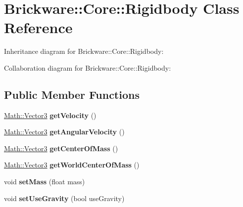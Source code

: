 \hypertarget{classBrickware_1_1Core_1_1Rigidbody}{}\section{Brickware\+:\+:Core\+:\+:Rigidbody Class Reference}
\label{classBrickware_1_1Core_1_1Rigidbody}


Inheritance diagram for Brickware\+:\+:Core\+:\+:Rigidbody\+:


Collaboration diagram for Brickware\+:\+:Core\+:\+:Rigidbody\+:
\subsection*{Public Member Functions}
\begin{DoxyCompactItemize}
\item 
\hypertarget{classBrickware_1_1Core_1_1Rigidbody_a81f19d34c34cb8ee6ab795c8b5323290}{}\hyperlink{classBrickware_1_1Math_1_1Vector3}{Math\+::\+Vector3} {\bfseries get\+Velocity} ()\label{classBrickware_1_1Core_1_1Rigidbody_a81f19d34c34cb8ee6ab795c8b5323290}

\item 
\hypertarget{classBrickware_1_1Core_1_1Rigidbody_a3047483419d00bfcf3c30fd0716964ce}{}\hyperlink{classBrickware_1_1Math_1_1Vector3}{Math\+::\+Vector3} {\bfseries get\+Angular\+Velocity} ()\label{classBrickware_1_1Core_1_1Rigidbody_a3047483419d00bfcf3c30fd0716964ce}

\item 
\hypertarget{classBrickware_1_1Core_1_1Rigidbody_a0c776a54725dbaae12909bc874359151}{}\hyperlink{classBrickware_1_1Math_1_1Vector3}{Math\+::\+Vector3} {\bfseries get\+Center\+Of\+Mass} ()\label{classBrickware_1_1Core_1_1Rigidbody_a0c776a54725dbaae12909bc874359151}

\item 
\hypertarget{classBrickware_1_1Core_1_1Rigidbody_a85a7b3e642bcb48ae9cc9a7ab5aadb2b}{}\hyperlink{classBrickware_1_1Math_1_1Vector3}{Math\+::\+Vector3} {\bfseries get\+World\+Center\+Of\+Mass} ()\label{classBrickware_1_1Core_1_1Rigidbody_a85a7b3e642bcb48ae9cc9a7ab5aadb2b}

\item 
\hypertarget{classBrickware_1_1Core_1_1Rigidbody_a4311e78f1313a6fc5287d94f357cfe9e}{}void {\bfseries set\+Mass} (float mass)\label{classBrickware_1_1Core_1_1Rigidbody_a4311e78f1313a6fc5287d94f357cfe9e}

\item 
\hypertarget{classBrickware_1_1Core_1_1Rigidbody_aeff49e94165023166460efac41cc3817}{}void {\bfseries set\+Use\+Gravity} (bool use\+Gravity)\label{classBrickware_1_1Core_1_1Rigidbody_aeff49e94165023166460efac41cc3817}


\end{DoxyCompactItemize}
